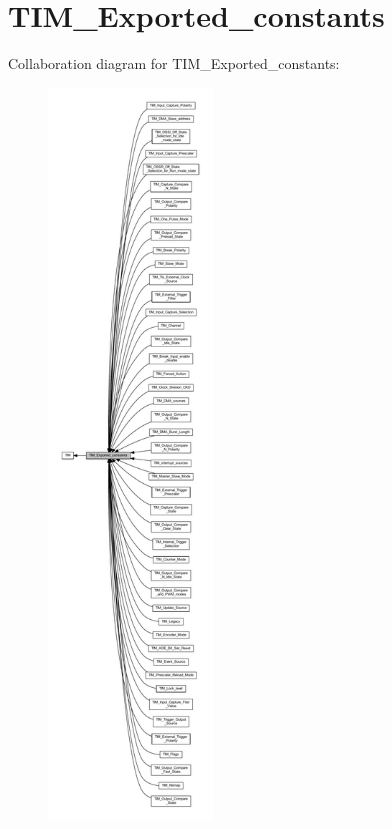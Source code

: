 \hypertarget{group___t_i_m___exported__constants}{}\section{T\+I\+M\+\_\+\+Exported\+\_\+constants}
\label{group___t_i_m___exported__constants}
Collaboration diagram for T\+I\+M\+\_\+\+Exported\+\_\+constants\+:\nopagebreak
\begin{figure}[H]
\begin{center}
\leavevmode
\includegraphics[height=550pt]{group___t_i_m___exported__constants}
\end{center}
\end{figure}
